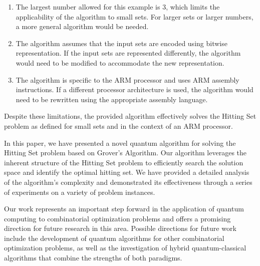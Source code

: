 \begin{enumerate}
\item The largest number allowed for this example is 3, which limits the applicability of the algorithm to small sets. For larger sets or larger numbers, a more general algorithm would be needed.

\item The algorithm assumes that the input sets are encoded using bitwise representation. If the input sets are represented differently, the algorithm would need to be modified to accommodate the new representation.

\item The algorithm is specific to the ARM processor and uses ARM assembly instructions. If a different processor architecture is used, the algorithm would need to be rewritten using the appropriate assembly language.

\end{enumerate}

Despite these limitations, the provided algorithm effectively solves the Hitting Set problem as defined for small sets and in the context of an ARM processor.

In this paper, we have presented a novel quantum algorithm for solving the Hitting Set problem based on Grover's Algorithm. Our algorithm leverages the inherent structure of the Hitting Set problem to efficiently search the solution space and identify the optimal hitting set. We have provided a detailed analysis of the algorithm's complexity and demonstrated its effectiveness through a series of experiments on a variety of problem instances.

Our work represents an important step forward in the application of quantum computing to combinatorial optimization problems and offers a promising direction for future research in this area. Possible directions for future work include the development of quantum algorithms for other combinatorial optimization problems, as well as the investigation of hybrid quantum-classical algorithms that combine the strengths of both paradigms.

